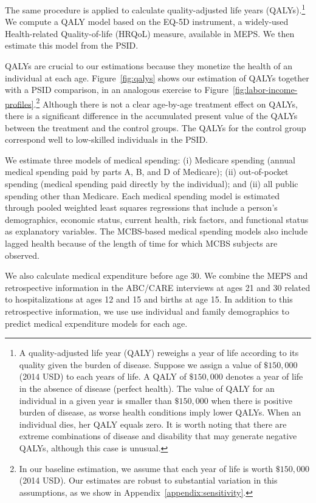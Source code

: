 The same procedure is applied to calculate quality-adjusted life years (QALYs).\footnote{A quality-adjusted life year (QALY) reweighs a year of life according to its quality given the burden of disease. Suppose we assign a value of $\$150,000$ (2014 USD) to each years of life. A QALY of $\$150,000$ denotes a year of life in the absence of disease (perfect health). The value of QALY for an individual in a given year is smaller than $\$150,000$ when there is positive burden of disease, as worse health conditions imply lower QALYs. When an individual dies, her QALY equals zero. It is worth noting that there are extreme combinations of disease and disability that may generate negative QALYs, although this case is unusual.} We compute a QALY model based on the EQ-5D instrument, a widely-used Health-related Quality-of-life (HRQoL) measure, available in MEPS. We then estimate this model from the PSID.

QALYs are crucial to our estimations because they monetize the health of an individual at each age. Figure~\ref{fig:qalys} shows our estimation of QALYs together with a PSID comparison, in an analogous exercise to Figure~\ref{fig:labor-income-profiles}.\footnote{In our baseline estimation, we assume that each year of life is worth  $\$150,000$ (2014 USD). Our estimates are robust to substantial variation in this assumptions, as we show in Appendix~\ref{appendix:sensitivity}.} Although there is not a clear age-by-age treatment effect on QALYs, there is a significant difference in the accumulated present value of the QALYs between the treatment and the control groups. The QALYs for the control group correspond well to low-skilled individuals in the PSID.

We estimate three models of medical spending: (i) Medicare spending (annual medical spending paid by parts A, B, and D of Medicare); (ii) out-of-pocket spending (medical spending paid directly by the individual); and (ii) all public spending other than Medicare. Each medical spending model is estimated through pooled weighted least squares regressions that include a person's demographics, economic status, current health, risk factors, and functional status as explanatory variables. The MCBS-based medical spending models also include lagged health because of the length of time for which MCBS subjects are observed.

We also calculate medical expenditure before age 30. We combine the MEPS and retrospective information in the ABC/CARE interviews at ages 21 and 30 related to hospitalizations at ages 12 and 15 and births at age 15. In addition to this retrospective information, we use use individual and family demographics to predict medical expenditure models for each age.

